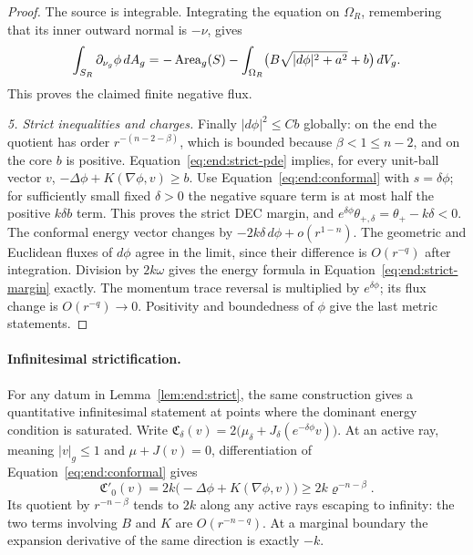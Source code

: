 \begin{proof}
The source is integrable.  Integrating the equation on
$\Omega_R$, remembering that its inner outward normal is
$-\nu$, gives
\[
 \int_{S_R}\partial_{\nu_g}\phi\,dA_g
 =-\operatorname{Area}_g(S)-\int_{\Omega_R}
              \bigl(B\sqrt{|d\phi|^2+a^2}+b\bigr)\,dV_g.
\]
This proves the claimed finite negative flux.

\medskip\noindent\emph{5. Strict inequalities and charges.}
Finally $|d\phi|^2\le Cb$ globally: on the end the quotient
has order $r^{-(n-2-\beta)}$, which is bounded because
$\beta<1\le n-2$, and on the core $b$ is positive.
Equation~\eqref{eq:end:strict-pde} implies, for every unit-ball
vector $v$,
$-\Delta\phi+K(\nabla\phi,v)\ge b$.
Use Equation~\eqref{eq:end:conformal} with $s=\delta\phi$;
for sufficiently small fixed $\delta>0$ the negative square
term is at most half the positive $k\delta b$ term.
This proves the strict DEC margin, and
$e^{\delta\phi}\theta_{+,\delta}=\theta_+-k\delta<0$.
The conformal energy vector changes by
$-2k\delta\,d\phi+o(r^{1-n})$.  The geometric and Euclidean
fluxes of $d\phi$ agree in the limit, since their difference
is $O(r^{-q})$ after integration.  Division by $2k\omega$
gives the energy formula in
Equation~\eqref{eq:end:strict-margin} exactly.  The momentum
trace reversal is multiplied by $e^{\delta\phi}$; its flux
change is $O(r^{-q})\to0$.  Positivity and boundedness of
$\phi$ give the last metric statements.
\end{proof}

\paragraph{Infinitesimal strictification.}
For any datum in Lemma~\ref{lem:end:strict}, the same construction
gives a quantitative infinitesimal statement at points where the
dominant energy condition is saturated. Write
$\mathfrak C_\delta(v)=2\bigl(\mu_\delta+
J_\delta(e^{-\delta\phi}v)\bigr)$.  At an active ray,
meaning $|v|_g\le1$ and $\mu+J(v)=0$, differentiation of
Equation~\eqref{eq:end:conformal} gives
\begin{equation}\label{eq:end:strict-direction}
 \mathfrak C'_0(v)=2k\bigl(-\Delta\phi+K(\nabla\phi,v)\bigr)
       \ge2k\varrho^{-n-\beta}.
\end{equation}
Its quotient by $r^{-n-\beta}$ tends to $2k$ along any active
rays escaping to infinity: the two terms involving $B$ and $K$
are $O(r^{-n-q})$.  At a marginal boundary the expansion
derivative of the same direction is exactly $-k$.

